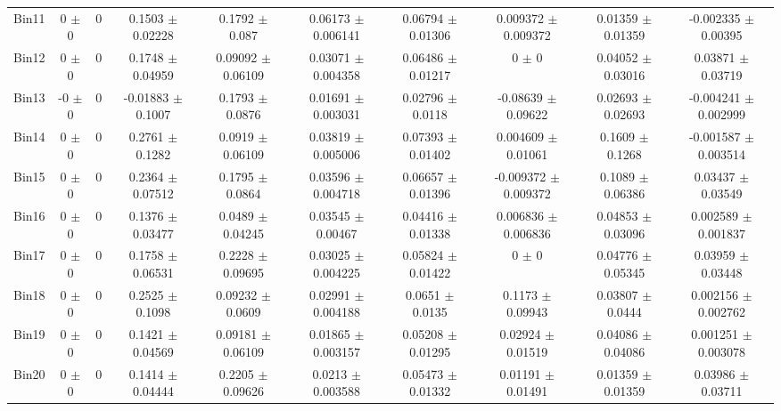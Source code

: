 \begin{tabular}{@{\extracolsep{4pt}}lccccccccc@{}}
     Bin11 & 0 $\pm$ 0 & 0 & 0.1503 $\pm$ 0.02228 & 0.1792 $\pm$ 0.087 & 0.06173 $\pm$ 0.006141 & 0.06794 $\pm$ 0.01306 & 0.009372 $\pm$ 0.009372 & 0.01359 $\pm$ 0.01359 & -0.002335 $\pm$ 0.00395 \\ 
     Bin12 & 0 $\pm$ 0 & 0 & 0.1748 $\pm$ 0.04959 & 0.09092 $\pm$ 0.06109 & 0.03071 $\pm$ 0.004358 & 0.06486 $\pm$ 0.01217 & 0 $\pm$ 0 & 0.04052 $\pm$ 0.03016 & 0.03871 $\pm$ 0.03719 \\ 
     Bin13 & -0 $\pm$ 0 & 0 & -0.01883 $\pm$ 0.1007 & 0.1793 $\pm$ 0.0876 & 0.01691 $\pm$ 0.003031 & 0.02796 $\pm$ 0.0118 & -0.08639 $\pm$ 0.09622 & 0.02693 $\pm$ 0.02693 & -0.004241 $\pm$ 0.002999 \\ 
     Bin14 & 0 $\pm$ 0 & 0 & 0.2761 $\pm$ 0.1282 & 0.0919 $\pm$ 0.06109 & 0.03819 $\pm$ 0.005006 & 0.07393 $\pm$ 0.01402 & 0.004609 $\pm$ 0.01061 & 0.1609 $\pm$ 0.1268 & -0.001587 $\pm$ 0.003514 \\ 
     Bin15 & 0 $\pm$ 0 & 0 & 0.2364 $\pm$ 0.07512 & 0.1795 $\pm$ 0.0864 & 0.03596 $\pm$ 0.004718 & 0.06657 $\pm$ 0.01396 & -0.009372 $\pm$ 0.009372 & 0.1089 $\pm$ 0.06386 & 0.03437 $\pm$ 0.03549 \\ 
     Bin16 & 0 $\pm$ 0 & 0 & 0.1376 $\pm$ 0.03477 & 0.0489 $\pm$ 0.04245 & 0.03545 $\pm$ 0.00467 & 0.04416 $\pm$ 0.01338 & 0.006836 $\pm$ 0.006836 & 0.04853 $\pm$ 0.03096 & 0.002589 $\pm$ 0.001837 \\ 
     Bin17 & 0 $\pm$ 0 & 0 & 0.1758 $\pm$ 0.06531 & 0.2228 $\pm$ 0.09695 & 0.03025 $\pm$ 0.004225 & 0.05824 $\pm$ 0.01422 & 0 $\pm$ 0 & 0.04776 $\pm$ 0.05345 & 0.03959 $\pm$ 0.03448 \\ 
     Bin18 & 0 $\pm$ 0 & 0 & 0.2525 $\pm$ 0.1098 & 0.09232 $\pm$ 0.0609 & 0.02991 $\pm$ 0.004188 & 0.0651 $\pm$ 0.0135 & 0.1173 $\pm$ 0.09943 & 0.03807 $\pm$ 0.0444 & 0.002156 $\pm$ 0.002762 \\ 
     Bin19 & 0 $\pm$ 0 & 0 & 0.1421 $\pm$ 0.04569 & 0.09181 $\pm$ 0.06109 & 0.01865 $\pm$ 0.003157 & 0.05208 $\pm$ 0.01295 & 0.02924 $\pm$ 0.01519 & 0.04086 $\pm$ 0.04086 & 0.001251 $\pm$ 0.003078 \\ 
     Bin20 & 0 $\pm$ 0 & 0 & 0.1414 $\pm$ 0.04444 & 0.2205 $\pm$ 0.09626 & 0.0213 $\pm$ 0.003588 & 0.05473 $\pm$ 0.01332 & 0.01191 $\pm$ 0.01491 & 0.01359 $\pm$ 0.01359 & 0.03986 $\pm$ 0.03711 \\ 
\hline\hline
  \end{tabular}
